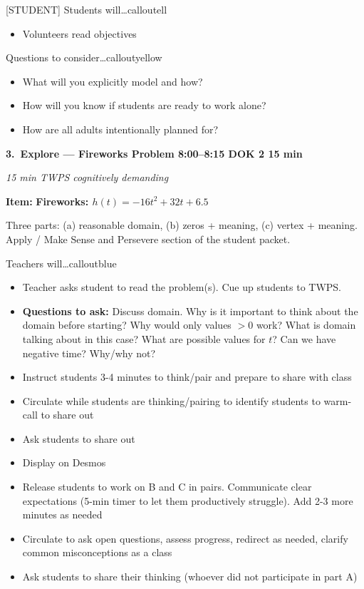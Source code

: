 \documentclass[10pt]{article}
\newcommand{\phasehead}[6]{%
  \vspace{0.25em}
  \noindent\colorbox{tealheader}{\parbox{\dimexpr\linewidth-2\fboxsep}{%
    \color{white}\bfseries #1.\ #2 \hfill \normalfont\bfseries #3 \textbullet{} DOK #4 \textbullet{} #5 min%
  }}\par
  {\small\itshape\color{framegray}#6}\par
  \smallskip
}
\newcommand{\itembox}[2]{%
  \begin{tcolorbox}[
    enhanced, breakable, colback=frameshade, colframe=dayblue,
    boxrule=0.6pt, arc=2pt, left=7pt, right=7pt, top=4pt, bottom=4pt
  ]
  \textbf{Item:} \textbf{#1}\par#2
  \end{tcolorbox}
}
\begin{document}
\begin{callout}{[STUDENT] Students will\ldots}{calloutell}
\begin{itemize}[leftmargin=1.4em,itemsep=1pt,topsep=1pt]
  \item Volunteers read objectives
\end{itemize}
\end{callout}

\begin{callout}{\IconPuzzle{} Questions to consider\ldots}{calloutyellow}
\begin{itemize}[leftmargin=1.4em,itemsep=1pt,topsep=1pt]
  \item What will you explicitly model and how?
  \item How will you know if students are ready to work alone?
  \item How are all adults intentionally planned for?
\end{itemize}
\end{callout}

\phasehead{3}{Explore --- Fireworks Problem}{8:00--8:15}{2}{15}{15 min \textbullet{} TWPS \textbullet{} cognitively demanding}

\itembox{Fireworks: $h(t) = -16t^2 + 32t + 6.5$}{Three parts: (a) reasonable domain, (b) zeros + meaning, (c) vertex + meaning. Apply / Make Sense and Persevere section of the student packet.}

\begin{callout}{\IconSpeak{} Teachers will\ldots}{calloutblue}
\begin{itemize}[leftmargin=1.4em,itemsep=1pt,topsep=1pt]
  \item Teacher asks student to read the problem(s). Cue up students to TWPS.
  \item \textbf{Questions to ask:} Discuss domain. Why is it important to think about the domain before starting? Why would only values $> 0$ work? What is domain talking about in this case? What are possible values for $t$? Can we have negative time? Why/why not?
  \item Instruct students 3-4 minutes to think/pair and prepare to share with class
  \item Circulate while students are thinking/pairing to identify students to warm-call to share out
  \item Ask students to share out
  \item Display on Desmos
  \item Release students to work on B and C in pairs. Communicate clear expectations (5-min timer to let them productively struggle). Add 2-3 more minutes as needed
  \item Circulate to ask open questions, assess progress, redirect as needed, clarify common misconceptions as a class
  \item Ask students to share their thinking (whoever did not participate in part A)
\end{itemize}
\end{callout}
\end{document}

